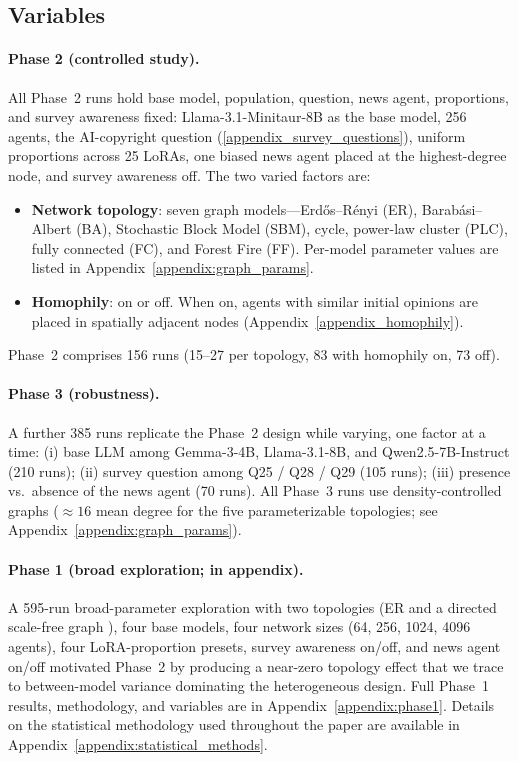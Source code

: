 \documentclass[11pt]{article}
\begin{document}
\subsection{Variables}
\label{variables}

\paragraph{Phase 2 (controlled study).} All Phase~2 runs hold base model, population, question, news agent, proportions, and survey awareness fixed: Llama-3.1-Minitaur-8B as the base model, 256 agents, the AI-copyright question (\ref{appendix_survey_questions}), uniform proportions across 25 LoRAs, one biased news agent placed at the highest-degree node, and survey awareness off. The two varied factors are:
\label{variables_phase_2}

\begin{itemize}
    \item \textbf{Network topology}: seven graph models---Erd\H{o}s--R\'{e}nyi (ER), Barab\'{a}si--Albert (BA), Stochastic Block Model (SBM), cycle, power-law cluster (PLC), fully connected (FC), and Forest Fire (FF). Per-model parameter values are listed in Appendix~\ref{appendix:graph_params}.
    \item \textbf{Homophily}: on or off. When on, agents with similar initial opinions are placed in spatially adjacent nodes (Appendix~\ref{appendix_homophily}).
\end{itemize}

Phase~2 comprises 156 runs (15--27 per topology, 83 with homophily on, 73 off).

\paragraph{Phase 3 (robustness).} A further 385 runs replicate the Phase~2 design while varying, one factor at a time: (i) base LLM among Gemma-3-4B, Llama-3.1-8B, and Qwen2.5-7B-Instruct \cite{binz2025foundation,qwen2,gemma_2025} (210 runs); (ii) survey question among Q25 / Q28 / Q29 (105 runs); (iii) presence vs.\ absence of the news agent (70 runs). All Phase~3 runs use density-controlled graphs ($\approx 16$ mean degree for the five parameterizable topologies; see Appendix~\ref{appendix:graph_params}).

\paragraph{Phase 1 (broad exploration; in appendix).} A 595-run broad-parameter exploration with two topologies (ER and a directed scale-free graph \cite{10.5555/644108.644133}), four base models, four network sizes (64, 256, 1024, 4096 agents), four LoRA-proportion presets, survey awareness on/off, and news agent on/off motivated Phase~2 by producing a near-zero topology effect that we trace to between-model variance dominating the heterogeneous design. Full Phase~1 results, methodology, and variables are in Appendix~\ref{appendix:phase1}. Details on the statistical methodology used throughout the paper are available in Appendix~\ref{appendix:statistical_methods}.
\end{document}
